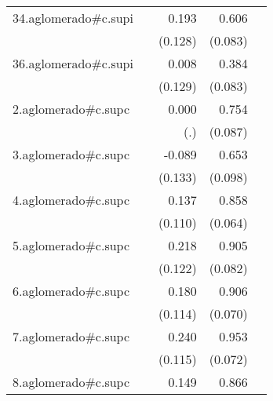 {\begin{longtable}{l*{4}{D{.}{.}{-1}}}
\addlinespace
34.aglomerado#c.supi&                     &       0.193         &       0.606\sym{***}&                     \\
            &                     &     (0.128)         &     (0.083)         &                     \\
\addlinespace
36.aglomerado#c.supi&                     &       0.008         &       0.384\sym{***}&                     \\
            &                     &     (0.129)         &     (0.083)         &                     \\
\addlinespace
2.aglomerado#c.supc&                     &       0.000         &       0.754\sym{***}&                     \\
            &                     &         (.)         &     (0.087)         &                     \\
\addlinespace
3.aglomerado#c.supc&                     &      -0.089         &       0.653\sym{***}&                     \\
            &                     &     (0.133)         &     (0.098)         &                     \\
\addlinespace
4.aglomerado#c.supc&                     &       0.137         &       0.858\sym{***}&                     \\
            &                     &     (0.110)         &     (0.064)         &                     \\
\addlinespace
5.aglomerado#c.supc&                     &       0.218         &       0.905\sym{***}&                     \\
            &                     &     (0.122)         &     (0.082)         &                     \\
\addlinespace
6.aglomerado#c.supc&                     &       0.180         &       0.906\sym{***}&                     \\
            &                     &     (0.114)         &     (0.070)         &                     \\
\addlinespace
7.aglomerado#c.supc&                     &       0.240\sym{*}  &       0.953\sym{***}&                     \\
            &                     &     (0.115)         &     (0.072)         &                     \\
\addlinespace
8.aglomerado#c.supc&                     &       0.149         &       0.866\sym{***}&                     \\

\end{longtable}}
